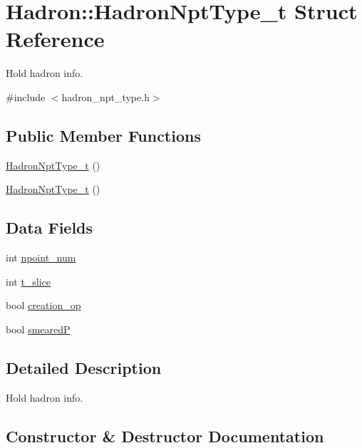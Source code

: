 \hypertarget{structHadron_1_1HadronNptType__t}{}\section{Hadron\+:\+:Hadron\+Npt\+Type\+\_\+t Struct Reference}
\label{structHadron_1_1HadronNptType__t}


Hold hadron info.  




{\ttfamily \#include $<$hadron\+\_\+npt\+\_\+type.\+h$>$}

\subsection*{Public Member Functions}
\begin{DoxyCompactItemize}
\item 
\mbox{\hyperlink{structHadron_1_1HadronNptType__t_aa4d6f71867ef932b64fe7f6a9ba7bc2d}{Hadron\+Npt\+Type\+\_\+t}} ()
\item 
\mbox{\hyperlink{structHadron_1_1HadronNptType__t_aa4d6f71867ef932b64fe7f6a9ba7bc2d}{Hadron\+Npt\+Type\+\_\+t}} ()
\end{DoxyCompactItemize}
\subsection*{Data Fields}
\begin{DoxyCompactItemize}
\item 
int \mbox{\hyperlink{structHadron_1_1HadronNptType__t_a926db91f96db2c9d670df6ebec2ece5b}{npoint\+\_\+num}}
\item 
int \mbox{\hyperlink{structHadron_1_1HadronNptType__t_a9525dc3ea9b4e2a1ec8f9ca1c1eb275c}{t\+\_\+slice}}
\item 
bool \mbox{\hyperlink{structHadron_1_1HadronNptType__t_a65d081620d4746364ee92979f1c663e6}{creation\+\_\+op}}
\item 
bool \mbox{\hyperlink{structHadron_1_1HadronNptType__t_ae339f43ad2a511982ecb2cf581982af6}{smearedP}}
\end{DoxyCompactItemize}


\subsection{Detailed Description}
Hold hadron info. 

\subsection{Constructor \& Destructor Documentation}
\mbox{\label{structHadron_1_1HadronNptType__t_aa4d6f71867ef932b64fe7f6a9ba7bc2d}} 
